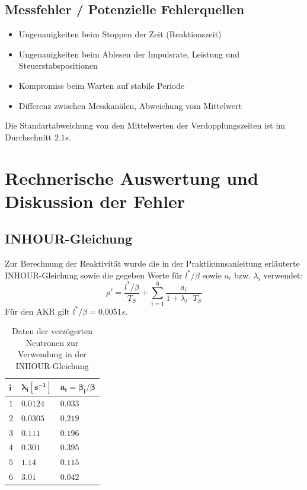 \documentclass[12pt,german]{article}
\begin{document}
    \subsection{Messfehler / Potenzielle Fehlerquellen}
    \begin{itemize}
        \item Ungenauigkeiten beim Stoppen der Zeit (Reaktionszeit)
        \item Ungenauigkeiten beim Ablesen der Impulsrate, Leistung und Steuerstabspositionen
        \item Kompromiss beim Warten auf stabile Periode
        \item Differenz zwischen Messkanälen, Abweichung vom Mittelwert
    \end{itemize}
    Die Standartabweichung von den Mittelwerten der Verdopplungszeiten ist im Durchschnitt $2.1s$.

    \section{Rechnerische Auswertung und Diskussion der Fehler}
    \subsection{INHOUR-Gleichung}
    Zur Berechnung der Reaktivität wurde die in der Praktikumsanleitung erläuterte INHOUR-Gleichung 
    sowie die gegeben Werte für $ l^* / \beta $ sowie $ a_i $ bzw. $ \lambda_i $ verwendet:
    \begin{equation*}
        \rho' = \frac{l^* / \beta}{T_S} + \sum^6_{i=1} \frac{a_i}{1 + \lambda_i \cdot T_S}
    \end{equation*}
    Für den AKR gilt $ l^* / \beta = 0.0051 s $.
    \begin{table}[H]
        \centering
            \begin{tabularx}{0.5\textwidth}{X|X|X}
            \toprule
            $ \mathbf{i} $ & $ \mathbf{\lambda_i [s^{-1}]} $ & $ \mathbf{a_i = \beta_i / \beta} $ \\
            \midrule
            $ 1 $ & $ 0.0124 $ & $ 0.033 $ \\
            $ 2 $ & $ 0.0305 $ & $ 0.219 $ \\
            $ 3 $ & $ 0.111 $ & $ 0.196 $ \\
            $ 4 $ & $ 0.301 $ & $ 0.395 $ \\
            $ 5 $ & $ 1.14 $ & $ 0.115 $ \\
            $ 6 $ & $ 3.01 $ & $ 0.042 $ \\
            \bottomrule
        \end{tabularx}
        \caption{Daten der verzögerten Neutronen zur Verwendung in der INHOUR-Gleichung}
    \end{table}
\end{document}
